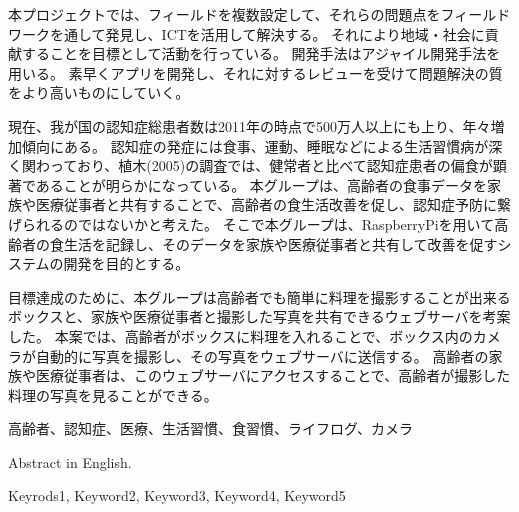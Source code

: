 \documentclass[../report]{subfiles}
\begin{document}
\begin{jabstract}
本プロジェクトでは、フィールドを複数設定して、それらの問題点をフィールドワークを通して発見し、ICTを活用して解決する。
それにより地域・社会に貢献することを目標として活動を行っている。
開発手法はアジャイル開発手法を用いる。
素早くアプリを開発し、それに対するレビューを受けて問題解決の質をより高いものにしていく。

現在、我が国の認知症総患者数は2011年の時点で500万人以上にも上り、年々増加傾向にある。
認知症の発症には食事、運動、睡眠などによる生活習慣病が深く関わっており、植木(2005)の調査では、健常者と比べて認知症患者の偏食が顕著であることが明らかになっている。
本グループは、高齢者の食事データを家族や医療従事者と共有することで、高齢者の食生活改善を促し、認知症予防に繋げられるのではないかと考えた。
そこで本グループは、RaspberryPiを用いて高齢者の食生活を記録し、そのデータを家族や医療従事者と共有して改善を促すシステムの開発を目的とする。

目標達成のために、本グループは高齢者でも簡単に料理を撮影することが出来るボックスと、家族や医療従事者と撮影した写真を共有できるウェブサーバを考案した。
本案では、高齢者がボックスに料理を入れることで、ボックス内のカメラが自動的に写真を撮影し、その写真をウェブサーバに送信する。
高齢者の家族や医療従事者は、このウェブサーバにアクセスすることで、高齢者が撮影した料理の写真を見ることができる。
\begin{jkeyword}
高齢者、認知症、医療、生活習慣、食習慣、ライフログ、カメラ
\end{jkeyword}
\end{jabstract}

\begin{eabstract} Abstract in English.
\begin{ekeyword}
Keyrods1, Keyword2, Keyword3, Keyword4, Keyword5
\end{ekeyword}
\end{eabstract}
\end{document}
